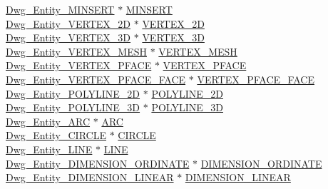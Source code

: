 \begin{DoxyCompactItemize}
\begin{tabbing}
\>\hyperlink{dwg_8h_a4672734ea3da51beb000f60e78a1f2db}{Dwg\_Entity\_MINSERT} $\ast$ \hyperlink{struct__dwg__object__entity_a3e443e5be2daea23680b18c8ac5ab7c9}{MINSERT}\\
\>\hyperlink{dwg_8h_a44d0f5d1cb96b7f28ce13250fd8734df}{Dwg\_Entity\_VERTEX\_2D} $\ast$ \hyperlink{struct__dwg__object__entity_a92b64fbc6038822408e9645b08593ea2}{VERTEX\_2D}\\
\>\hyperlink{dwg_8h_a77f4613ec7fdccff7df4384ffb59194c}{Dwg\_Entity\_VERTEX\_3D} $\ast$ \hyperlink{struct__dwg__object__entity_a5a35942c7a5a083d1be994934b45bdce}{VERTEX\_3D}\\
\>\hyperlink{dwg_8h_a1f016726bc16ce018fff997edb0224be}{Dwg\_Entity\_VERTEX\_MESH} $\ast$ \hyperlink{struct__dwg__object__entity_ab1133e0c1808c8abfa8d993705b21ed3}{VERTEX\_MESH}\\
\>\hyperlink{dwg_8h_a9717f6818cdf55e42bc25b700105d105}{Dwg\_Entity\_VERTEX\_PFACE} $\ast$ \hyperlink{struct__dwg__object__entity_a9a39c89348daf55314dacffb2afdf9d4}{VERTEX\_PFACE}\\
\>\hyperlink{dwg_8h_aac0a456a67a1d0630e7b65889a398264}{Dwg\_Entity\_VERTEX\_PFACE\_FACE} $\ast$ \hyperlink{struct__dwg__object__entity_ae6371e82d0ff5409a47312ae260d8cac}{VERTEX\_PFACE\_FACE}\\
\>\hyperlink{dwg_8h_a01ffa04fbe089237cefa5ceec87ec8eb}{Dwg\_Entity\_POLYLINE\_2D} $\ast$ \hyperlink{struct__dwg__object__entity_a564d06e52205ff6bb9a39a64f3bd47e7}{POLYLINE\_2D}\\
\>\hyperlink{dwg_8h_aeecca2ad7da6f864c83938889bd34b2c}{Dwg\_Entity\_POLYLINE\_3D} $\ast$ \hyperlink{struct__dwg__object__entity_aa1bace49f580d47d30eceb16c377d08c}{POLYLINE\_3D}\\
\>\hyperlink{dwg_8h_ae9308bcdcbc4aa6c430ea170f34db116}{Dwg\_Entity\_ARC} $\ast$ \hyperlink{struct__dwg__object__entity_a5f9a6442e5fcd91c1b2b315269b17c32}{ARC}\\
\>\hyperlink{dwg_8h_a796e332443d2d0819d762f4febac57c6}{Dwg\_Entity\_CIRCLE} $\ast$ \hyperlink{struct__dwg__object__entity_a79da338eb5772512f45b5808557f3501}{CIRCLE}\\
\>\hyperlink{dwg_8h_a0655e77a6bf86935e2f18db59a4b9368}{Dwg\_Entity\_LINE} $\ast$ \hyperlink{struct__dwg__object__entity_a141a244a2ecfc90698708fca1c9af2d9}{LINE}\\
\>\hyperlink{dwg_8h_ab058dd56995b5779d66a24b569fe2963}{Dwg\_Entity\_DIMENSION\_ORDINATE} $\ast$ \hyperlink{struct__dwg__object__entity_aa84e6524d89a64ae503967cd353a1bdd}{DIMENSION\_ORDINATE}\\
\>\hyperlink{dwg_8h_a6488ce91843650c1c9487a7ff7438bdb}{Dwg\_Entity\_DIMENSION\_LINEAR} $\ast$ \hyperlink{struct__dwg__object__entity_ad30c3401522ab4742603dc0d0631dfb4}{DIMENSION\_LINEAR}\\

\end{tabbing}
\end{DoxyCompactItemize}
